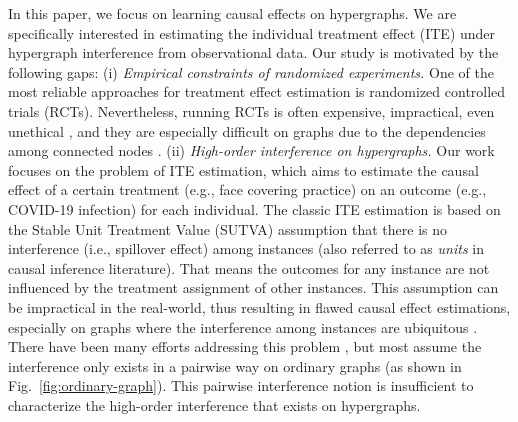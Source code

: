 In this paper, we focus on learning causal effects on hypergraphs. We are specifically interested in estimating the individual treatment effect (ITE) under hypergraph interference from observational data. Our study is motivated by the following gaps:  
(i) \textit{Empirical constraints of randomized experiments.} One of the most reliable approaches for treatment effect estimation is randomized controlled trials (RCTs). Nevertheless, running RCTs is often expensive, impractical, even unethical \cite{goldstein2018ethical}, and they are especially difficult on graphs due to the dependencies among connected nodes \cite{ugander2013graph}.
(ii)  \textit{High-order interference on hypergraphs.} Our work focuses on the problem of ITE estimation, which aims to estimate the causal effect of a certain treatment (e.g., face covering practice) on an outcome (e.g., COVID-19 infection) for each individual. The classic ITE estimation is based on the Stable Unit Treatment Value (SUTVA) assumption \cite{fisher1936design,splawa1990application} that there is no interference \cite{tchetgen2012causal,hudgens2008toward} (i.e., spillover effect) among instances {(also referred to as \textit{units} in causal inference literature)}. That means the outcomes for any instance are not influenced by the treatment assignment of other instances. This assumption can be impractical in the real-world, thus resulting in flawed causal effect estimations, especially on graphs  where the interference among instances are ubiquitous \cite{ahluwalia2001moderating,yilmaz2002geographic,zeng2019exploration}. There have been many efforts addressing this problem \cite{aronow2017estimating,basse2018analyzing,imai2020causal,kohavi2013online,tchetgen2012causal,ugander2013graph,yuan2021causal,ma2021causal}, but most assume the interference only exists in a pairwise way on ordinary graphs (as shown in Fig.~\ref{fig:ordinary-graph}). This pairwise interference notion is insufficient to characterize the high-order interference that exists on hypergraphs. 
